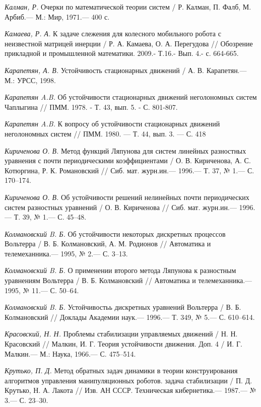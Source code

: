 \begin{thebibliography}{10}
	{\it Калман, Р.} Очерки по математической теории систем / Р. Калман, П. Фалб, М. Арбиб.—
	М.: Мир, 1971.— 400 с.
	
	
	{\it Камаева, Р. А.} К задаче слежения для колесного мобильного робота с неизвестной матрицей инерции / Р. А. Камаева, О. А. Перегудова // Обозрение прикладной и промышленной математики. 2009.- Т.16.- Вып. 4.- с. 664-665.
	
	{\it Карапетян, А. В.} Устойчивость стационарных движений / А. В. Карапетян.—
	М.: УРСС, 1998.
	
	{\it Карапетян A.B.} Об устойчивости стационарных движений неголономных систем Чаплыгина // ПММ. 1978. - Т. 43, вып. 5. - С. 801-807.
	
	{\it Карапетян A.B.} К вопросу об устойчивости стационарных движений неголономных систем // ПММ. 1980. — Т. 44, вып. 3. — С. 418
	
	{\it Кириченова О. В.} Метод функций Ляпунова для систем линейных разностных уравнения с почти периодическими коэффициентами / О. В. Кириченова, А. С. Котюргина, Р. К. Романовский //
	Сиб. мат. журн.ин.— 1996.— Т. 37, № 1.— С. 170–174.
	
	{\it Кириченова О. В.} Об устойчивости решений нелинейных почти периодических систем разностных уравнений / О. В. Кириченова // Сиб. мат. журн.ин.— 1996.— Т. 39, № 1.— С. 45–48.
	
	{\it Колмановский B. Б.} Об устойчивости некоторых дискретных процессов Вольтерра / В. Б. Колмановский, А. М. Родионов // Автоматика и телемеханника.— 1995, № 2.— С. 3–13.
	
	{\it Колмановский B. Б.} О применении второго метода Ляпунова к разностным уравнениям Вольтерра / В. Б. Колмановский // Автоматика и телемеханника.— 1995, № 11.— С. 50–64.
	
	{\it Колмановский B. Б.} Устойчивостьь дискретных уравнений Вольтерра / В. Б. Колмановский // Доклады Академии наук.— 1996.— Т. 349, № 5.— С. 610–614.
	
	{\it Красовский, Н. Н.} Проблемы стабилизации управляемых движений / Н. Н. Красовский
	// Малкин, И. Г. Теория устойчивости движения. Доп. 4 / И. Г. Малкин.— М.:
	Наука, 1966.— С. 475–514.
	
	{\it Крутько, П. Д.} Метод обратных задач динамики в теории конструирования алгоритмов
	управления манипуляционных роботов. задача стабилизации / П. Д. Крутько, Н. А. Лакота
	// Изв. АН СССР. Техническая кибернетика.— 1987.— № 3.— С. 23–30.
	

\end{thebibliography}
